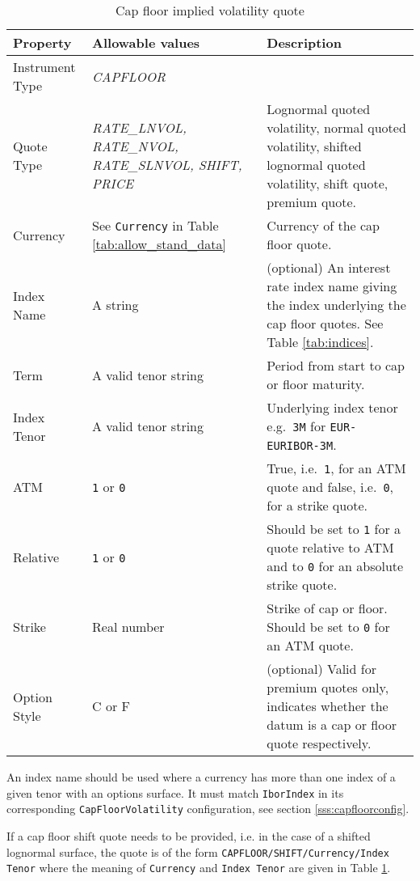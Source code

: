 \begin{table}[H]
\centering
  \begin{tabular}{|p{3cm}|p{3.5cm}|p{7cm}|}
	\hline
	{\bf Property} & {\bf Allowable values} & {\bf Description} \\ \hline
	Instrument Type & \emph{CAPFLOOR} & \\ \hline
	Quote Type &  \emph{RATE\_LNVOL, RATE\_NVOL, RATE\_SLNVOL, SHIFT, PRICE} & Lognormal quoted volatility, normal quoted volatility, shifted lognormal quoted volatility, shift quote, premium quote. \\ \hline
	Currency & See \lstinline!Currency! in Table \ref{tab:allow_stand_data}&  Currency of the cap floor quote. \\ \hline
	Index Name & A string & (optional) An interest rate index name giving the index underlying the cap floor quotes. See Table \ref{tab:indices}. \\ \hline
	Term & A valid tenor string & Period from start to cap or floor maturity. \\ \hline
	Index Tenor & A valid tenor string & Underlying index tenor e.g.\ \lstinline!3M! for \lstinline!EUR-EURIBOR-3M!. \\ \hline
	ATM & \lstinline!1! or \lstinline!0! & True, i.e.\ \lstinline!1!, for an ATM quote and false, i.e.\ \lstinline!0!, for a strike quote. \\ \hline
	Relative & \lstinline!1! or \lstinline!0! & Should be set to \lstinline!1! for a quote relative to ATM  and to \lstinline!0! for an absolute strike quote. \\ \hline
	Strike & Real number & Strike of cap or floor. Should be set to \lstinline!0! for an ATM quote. \\ \hline
	Option Style & C or F & (optional) Valid for premium quotes only, indicates whether the datum is a cap or floor quote respectively. \\ \hline
\end{tabular}
  \caption{Cap floor implied volatility quote}
  \label{tab:capfloor_implvol_quote}
\end{table}

An index name should be used where a currency has more than one index of a given tenor with an options surface. It must match \lstinline!IborIndex! in its corresponding \lstinline!CapFloorVolatility! configuration, see section \ref{sss:capfloorconfig}.

If a cap floor shift quote needs to be provided, i.e. in the case of a shifted lognormal surface, the quote is of the form \lstinline!CAPFLOOR/SHIFT/Currency/Index Tenor! where the meaning of \lstinline!Currency! and \lstinline!Index Tenor! are given in Table \ref{tab:capfloor_implvol_quote}.

